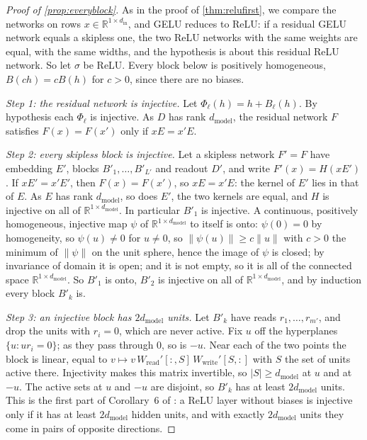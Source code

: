 \documentclass[10pt]{article}
\theoremstyle{definition}
\theoremstyle{remark}
\newcommand{\R}{\mathbb{R}}
\newcommand{\Wread}{W_{\mathrm{read}}}
\newcommand{\Wwrite}{W_{\mathrm{write}}}
\newcommand{\dm}{d_{\mathrm{model}}}
\newcommand{\norm}[1]{\lVert #1\rVert}
\begin{document}
\begin{proof}[Proof of \cref{prop:everyblock}]
As in the proof of \cref{thm:relufirst}, we compare the networks on rows $x \in \R^{1\times d_{\mathrm{in}}}$, and GELU reduces to ReLU: if a residual GELU network equals a skipless one, the two ReLU networks with the same weights are equal, with the same widths, and the hypothesis is about this residual ReLU network. So let $\sigma$ be ReLU. Every block below is positively homogeneous, $B(ch) = cB(h)$ for $c > 0$, since there are no biases.

\emph{Step 1: the residual network is injective.} Let $\Phi_\ell(h) = h + B_\ell(h)$. By hypothesis each $\Phi_\ell$ is injective. As $D$ has rank $\dm$, the residual network $F$ satisfies $F(x) = F(x')$ only if $xE = x'E$.

\emph{Step 2: every skipless block is injective.} Let a skipless network $F' = F$ have embedding $E'$, blocks $B'_1, \dots, B'_{L'}$ and readout $D'$, and write $F'(x) = H(xE')$. If $xE' = x'E'$, then $F(x) = F(x')$, so $xE = x'E$: the kernel of $E'$ lies in that of $E$. As $E$ has rank $\dm$, so does $E'$, the two kernels are equal, and $H$ is injective on all of $\R^{1\times\dm}$. In particular $B'_1$ is injective. A continuous, positively homogeneous, injective map $\psi$ of $\R^{1\times\dm}$ to itself is onto: $\psi(0) = 0$ by homogeneity, so $\psi(u) \neq 0$ for $u \neq 0$, so $\norm{\psi(u)} \ge c\norm{u}$ with $c > 0$ the minimum of $\norm{\psi}$ on the unit sphere, hence the image of $\psi$ is closed; by invariance of domain it is open; and it is not empty, so it is all of the connected space $\R^{1\times\dm}$. So $B'_1$ is onto, $B'_2$ is injective on all of $\R^{1\times\dm}$, and by induction every block $B'_k$ is.

\emph{Step 3: an injective block has $2\dm$ units.} Let $B'_k$ have reads $r_1, \dots, r_{m'}$, and drop the units with $r_i = 0$, which are never active. Fix $u$ off the hyperplanes $\{u : ur_i = 0\}$; as they pass through $0$, so is $-u$. Near each of the two points the block is linear, equal to $v \mapsto v\,\Wread'[{:},S]\,\Wwrite'[S,{:}]$ with $S$ the set of units active there. Injectivity makes this matrix invertible, so $\lvert S\rvert \ge \dm$ at $u$ and at $-u$. The active sets at $u$ and $-u$ are disjoint, so $B'_k$ has at least $2\dm$ units. This is the first part of Corollary~6 of \citet{puthawala2022injective}: a ReLU layer without biases is injective only if it has at least $2\dm$ hidden units, and with exactly $2\dm$ units they come in pairs of opposite directions.
\end{proof}
\end{document}
